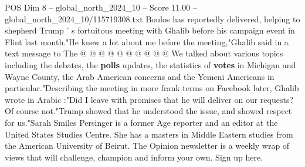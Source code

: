 \begin{textsample}{POS Dim 8 – global\_north\_2024\_10 – Score 11.00 – global\_north\_2024\_10/115719308.txt}
Boulos has reportedly delivered, helping to shepherd Trump ' s fortuitous meeting with Ghalib before his campaign event in Flint last month."He knew a lot about me before the meeting,"Ghalib said in a text message to The @ @ @ @ @ @ @ @ @ @ We talked about various topics including the debates, the \textbf{polls} updates, the statistics of \textbf{votes} in Michigan and Wayne County, the Arab American concerns and the Yemeni Americans in particular."Describing the meeting in more frank terms on Facebook later, Ghalib wrote in Arabic :"Did I leave with promises that he will deliver on our requests?
Of course not."Trump showed that he understood the issue, and showed respect for us."Sarah Smiles Persinger is a former Age reporter and an editor at the United States Studies Centre.
She has a masters in Middle Eastern studies from the American University of Beirut.
The Opinion newsletter is a weekly wrap of views that will challenge, champion and inform your own.
Sign up here.

\end{textsample}
